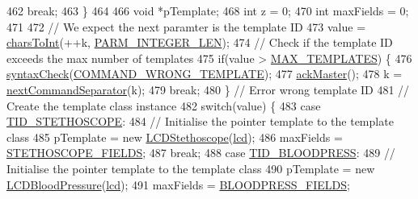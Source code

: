 \begin{DoxyCode}
462               \textcolor{keywordflow}{break};
463             \}
464             
466             \textcolor{keywordtype}{void} *pTemplate;
468             \textcolor{keywordtype}{int} z = 0;
470             \textcolor{keywordtype}{int} maxFields = 0;
471             
472             \textcolor{comment}{// We expect the next paramter is the template ID}
473             value = \hyperlink{_meditech___chip_kit_control_panel_8pde_ad893e606e19944faa6540bba9387370f}{charsToInt}(++k, \hyperlink{_command_processor_8h_a3bf9ddf196d90a4e4639a0c4a086b9c7}{PARM\_INTEGER\_LEN});
474             \textcolor{comment}{// Check if the template ID exceeds the max number of templates}
475             \textcolor{keywordflow}{if}(value > \hyperlink{_l_c_d_templates_8h_a0b935b9f5a6d3f57285fece1aa0a37a5}{MAX\_TEMPLATES}) \{
476               \hyperlink{_meditech___chip_kit_control_panel_8pde_a586164a6eff90eab6ba87a6ca123770d}{syntaxCheck}(\hyperlink{_parser_errors_8h_a5a9f152004095e86df06f3ac426d26fc}{COMMAND\_WRONG\_TEMPLATE});
477               \hyperlink{_meditech___chip_kit_control_panel_8pde_a4e435af9ec30d668c4cff6a97baa8e5a}{ackMaster}();
478               k = \hyperlink{_meditech___chip_kit_control_panel_8pde_a4b62bbf3dd6cf7eb7fee557932fd1b7c}{nextCommandSeparator}(k);
479               \textcolor{keywordflow}{break};
480             \} \textcolor{comment}{// Error wrong template ID}
481             \textcolor{comment}{// Create the template class instance}
482             \textcolor{keywordflow}{switch}(value) \{
483               \textcolor{keywordflow}{case} \hyperlink{_l_c_d_templates_8h_ac3ee9f1dc127335a24c11e2dc3a4c024}{TID\_STETHOSCOPE}:
484                 \textcolor{comment}{// Initialise the pointer template to the template class}
485                 pTemplate = \textcolor{keyword}{new} \hyperlink{class_l_c_d_stethoscope}{LCDStethoscope}(\hyperlink{_meditech___chip_kit_control_panel_8pde_ae0b100905fb0ed88dddaafda0aa05379}{lcd});
486                 maxFields = \hyperlink{_l_c_d_templates_8h_ab9c573f6265daafe7befb06655294666}{STETHOSCOPE\_FIELDS};
487               \textcolor{keywordflow}{break};
488               \textcolor{keywordflow}{case} \hyperlink{_l_c_d_templates_8h_aaf2c3d4506041e2dc83aa27f28ea6d81}{TID\_BLOODPRESS}:
489                 \textcolor{comment}{// Initialise the pointer template to the template class}
490                 pTemplate = \textcolor{keyword}{new} \hyperlink{class_l_c_d_blood_pressure}{LCDBloodPressure}(\hyperlink{_meditech___chip_kit_control_panel_8pde_ae0b100905fb0ed88dddaafda0aa05379}{lcd});
491                 maxFields = \hyperlink{_l_c_d_templates_8h_a31c8ffe16ffc1e2f21020d9f7d972c5d}{BLOODPRESS\_FIELDS};

\end{DoxyCode}
